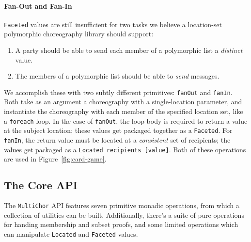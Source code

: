 \documentclass[sigplan,screen]{acmart}
\newcommand{\inlinecode}[2][haskell]{\texttt{#2}}
\newcommand{\MultiChor}{\texttt{Multi\-Chor}\xspace}
\begin{document}
\paragraph{Fan-Out and Fan-In}
\inlinecode{Faceted} values are still insufficient for two tasks we believe a location-set polymorphic
choreography library should support:
\begin{enumerate}[leftmargin=12pt, itemsep=0pt]
\item A party should be able to send each member of a polymorphic list a \emph{distinct} value.
\item The members of a polymorphic list should be able to \emph{send} messages.
\end{enumerate}
We accomplish these with two subtly different primitives:
\inlinecode{fanOut} and \inlinecode{fanIn}.
Both take as an argument a choreography with a single-location parameter,
and instantiate the choreography with each member of the specified location set,
like a \inlinecode[text]{foreach} loop.
In the case of \inlinecode{fanOut}, the loop-body is required to return a value at the subject 
location;
these values get packaged together as a \inlinecode{Faceted}.
For \inlinecode{fanIn}, the return value must be located at a \emph{consistent} set of recipients;
the values get packaged as a \inlinecode{Located recipients [value]}.
Both of these operations are used in Figure~\ref{fig:card-game}.


\subsection{The Core API}\label{sec:monad}

The \MultiChor API features seven primitive monadic operations,
from which a collection of utilities can be built.
Additionally, there's a suite of pure operations for handing membership and subset proofs,
and some limited operations which can manipulate \inlinecode{Located}
and \inlinecode{Faceted} values.
\end{document}
